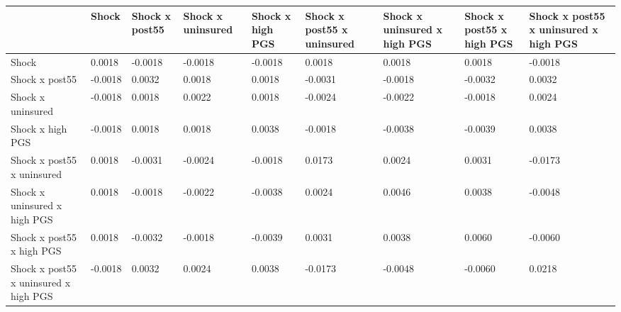 % 
\begin{tabular}{p{5cm}p{2cm}p{2cm}p{2cm}p{2cm}p{2cm}p{2cm}p{2cm}p{2cm}}
  \hline
 & Shock & Shock x post55 & Shock x uninsured & Shock x high PGS & Shock x post55 x uninsured & Shock x uninsured x high PGS &  Shock x post55 x high PGS & Shock x post55 x uninsured x high PGS \\ 
  \hline
Shock & 0.0018 & -0.0018 & -0.0018 & -0.0018 & 0.0018 & 0.0018 & 0.0018 & -0.0018 \\ 
  Shock x post55 & -0.0018 & 0.0032 & 0.0018 & 0.0018 & -0.0031 & -0.0018 & -0.0032 & 0.0032 \\ 
  Shock x uninsured & -0.0018 & 0.0018 & 0.0022 & 0.0018 & -0.0024 & -0.0022 & -0.0018 & 0.0024 \\ 
  Shock x high PGS & -0.0018 & 0.0018 & 0.0018 & 0.0038 & -0.0018 & -0.0038 & -0.0039 & 0.0038 \\ 
  Shock x post55 x uninsured & 0.0018 & -0.0031 & -0.0024 & -0.0018 & 0.0173 & 0.0024 & 0.0031 & -0.0173 \\ 
  Shock x uninsured x high PGS & 0.0018 & -0.0018 & -0.0022 & -0.0038 & 0.0024 & 0.0046 & 0.0038 & -0.0048 \\ 
   Shock x post55 x high PGS & 0.0018 & -0.0032 & -0.0018 & -0.0039 & 0.0031 & 0.0038 & 0.0060 & -0.0060 \\ 
  Shock x post55 x uninsured x high PGS & -0.0018 & 0.0032 & 0.0024 & 0.0038 & -0.0173 & -0.0048 & -0.0060 & 0.0218 \\ 
   \hline
\end{tabular}
